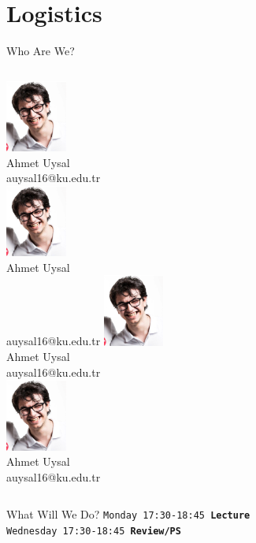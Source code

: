 	\section{Logistics}
		\begin{frame}{Who Are We?}
			\begin{columns}
				\column{5cm}
				\centering 
					\includegraphics[width=2.0cm]{images/ahmet.png}\\
					Ahmet Uysal\\
					auysal16@ku.edu.tr\\
					\includegraphics[width=2.0cm]{images/ahmet.png}\\
					Ahmet Uysal\\
					auysal16@ku.edu.tr
				\column{5cm}
				\centering
					\includegraphics[width=2.0cm]{images/ahmet.png}\\
					Ahmet Uysal\\
					auysal16@ku.edu.tr\\
					\includegraphics[width=2.0cm]{images/ahmet.png}\\
					Ahmet Uysal\\
					auysal16@ku.edu.tr
			\end{columns}
		\end{frame}

		\begin{frame}{What Will We Do?}
			\LARGE
			\texttt{Monday 17:30-18:45 \textbf{Lecture}}\\
			\texttt{Wednesday 17:30-18:45 \textbf{Review/PS}}\\
			\vspace{4mm}
			\centering
		\end{frame}

